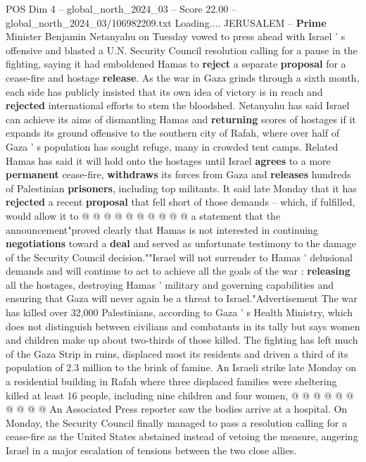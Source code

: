 \begin{textsample}{POS Dim 4 – global\_north\_2024\_03 – Score 22.00 – global\_north\_2024\_03/106982209.txt}  \label{ex:f4_pos_232}
Loading....
JERUSALEM -- \textbf{Prime} Minister Benjamin Netanyahu on Tuesday vowed to press ahead with Israel ' s offensive and blasted a U.N.
Security Council resolution calling for a pause in the fighting, saying it had emboldened Hamas to \textbf{reject} a separate \textbf{proposal} for a cease-fire and hostage \textbf{release}.
As the war in Gaza grinds through a sixth month, each side has publicly insisted that its own idea of victory is in reach and \textbf{rejected} international efforts to stem the bloodshed.
Netanyahu has said Israel can achieve its aims of dismantling Hamas and \textbf{returning} scores of hostages if it expands its ground offensive to the southern city of Rafah, where over half of Gaza ' s population has sought refuge, many in crowded tent camps.
Related Hamas has said it will hold onto the hostages until Israel \textbf{agrees} to a more \textbf{permanent} cease-fire, \textbf{withdraws} its forces from Gaza and \textbf{releases} hundreds of Palestinian \textbf{prisoners}, including top militants.
It said late Monday that it has \textbf{rejected} a recent \textbf{proposal} that fell short of those demands -- which, if fulfilled, would allow it to @ @ @ @ @ @ @ @ @ @ a statement that the announcement"proved clearly that Hamas is not interested in continuing \textbf{negotiations} toward a \textbf{deal} and served as unfortunate testimony to the damage of the Security Council decision.""Israel will not surrender to Hamas ' delusional demands and will continue to act to achieve all the goals of the war : \textbf{releasing} all the hostages, destroying Hamas ' military and governing capabilities and ensuring that Gaza will never again be a threat to Israel."Advertisement The war has killed over 32,000 Palestinians, according to Gaza ' s Health Ministry, which does not distinguish between civilians and combatants in its tally but says women and children make up about two-thirds of those killed.
The fighting has left much of the Gaza Strip in ruins, displaced most its residents and driven a third of its population of 2.3 million to the brink of famine.
An Israeli strike late Monday on a residential building in Rafah where three displaced families were sheltering killed at least 16 people, including nine children and four women, @ @ @ @ @ @ @ @ @ @ An Associated Press reporter saw the bodies arrive at a hospital.
On Monday, the Security Council finally managed to pass a resolution calling for a cease-fire as the United States abstained instead of vetoing the measure, angering Israel in a major escalation of tensions between the two close allies.

\end{textsample}

